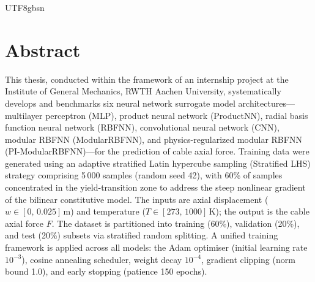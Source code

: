 \documentclass[a4paper,12pt]{report}
\newenvironment{abstracten}{%
  \chapter*{Abstract}
  \addcontentsline{toc}{chapter}{Abstract}
  \fontsize{11}{14}\selectfont\setlength{\baselineskip}{20pt}\noindent\ignorespaces
}{\par\vspace{0.5cm}}
\begin{document}
\begin{CJK}{UTF8}{gbsn}
\begin{abstracten}
This thesis, conducted within the framework of an internship project at the Institute of
General Mechanics, RWTH Aachen University, systematically develops and benchmarks six
neural network surrogate model architectures---multilayer perceptron (MLP), product neural
network (ProductNN), radial basis function neural network (RBFNN), convolutional neural
network (CNN), modular RBFNN (ModularRBFNN), and physics-regularized modular RBFNN
(PI-ModularRBFNN)---for the prediction of cable axial force. Training data were generated
using an adaptive stratified Latin hypercube sampling (Stratified LHS) strategy comprising
5\,000 samples (random seed 42), with 60\% of samples concentrated in the yield-transition
zone to address the steep nonlinear gradient of the bilinear constitutive model. The inputs
are axial displacement ($w \in [0,\,0.025]$\,m) and temperature ($T \in [273,\,1000]$\,K);
the output is the cable axial force $F$. The dataset is partitioned into training (60\%),
validation (20\%), and test (20\%) subsets via stratified random splitting. A unified
training framework is applied across all models: the Adam optimiser (initial learning rate
$10^{-3}$), cosine annealing scheduler, weight decay $10^{-4}$, gradient clipping (norm
bound 1.0), and early stopping (patience 150 epochs).


\end{abstracten}
\end{CJK}
\end{document}
